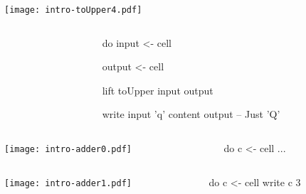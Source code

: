 \documentclass[UKenglish,usenames,dvipsnames,svgnames,table,aspectratio=169,mathserif]{beamer}
\newcommand{\nl}{\vspace{\baselineskip}}
\begin{document}
\begin{frame}[fragile]
\centering

\begin{overlayarea}{0.5\textwidth}{0.4\textheight}
\texttt{[image: intro-toUpper4.pdf]}
\end{overlayarea}

\begin{columns}
\begin{column}{0.3\textwidth}
\end{column}
\begin{column}{0.7\textwidth}
\begin{haskellcode}
do
  input  <- cell
\end{haskellcode}
\begin{haskellcode}
  output <- cell
\end{haskellcode}
\begin{haskellcode}
  lift toUpper input output
\end{haskellcode}
\nl
\begin{haskellcode}
  write input 'q'
  content output   -- Just 'Q'
\end{haskellcode}
\end{column}
\end{columns}

\end{frame}

\iffalse

\begin{frame}[fragile]
\begin{columns}
\begin{column}{0.5\textwidth}
\texttt{[image: intro-adder0.pdf]}
\end{column}
\begin{column}{0.5\textwidth}
\begin{haskellcode}
do
  c <- cell
  ...
\end{haskellcode}
\end{column}
\end{columns}
\end{frame}

\begin{frame}[fragile]
\begin{columns}
\begin{column}{0.5\textwidth}
\texttt{[image: intro-adder1.pdf]}
\end{column}
\begin{column}{0.5\textwidth}
\begin{haskellcode}
do
  c <- cell
  write c 3
\end{haskellcode}
\end{column}
\end{columns}
\end{frame}
\end{document}
